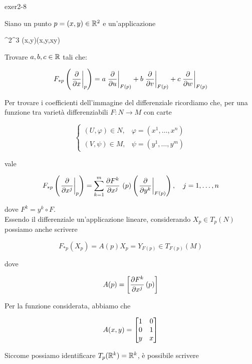 {exer2-8}
{
Siano un punto $ p = (x,y) \in \mathbb{R}^{2} $ e un'applicazione

	{\R^{2}}{\R^{3}}
	{(x,y)}{(x,y,xy)}

Trovare $ a,b,c \in \mathbb{R} $ tali che:

\begin{equation}
	F_{*p} \left( \eval{ \pdv{x} }_{p} \right) = a \eval{ \pdv{u} }_{F(p)} + b \eval{ \pdv{v} }_{F(p)} + c \eval{ \pdv{w} }_{F(p)}
\end{equation}
}
{
Per trovare i coefficienti dell'immagine del differenziale ricordiamo che, per una funzione tra varietà differenziabili $ F : N \to M $ con carte

\begin{equation}
	\begin{cases}
		(U,\varphi) \in N, & \varphi = (x^{1},\dots,x^{n}) \\
		(V,\psi) \in M, & \psi = (y^{1},\dots,y^{m})
	\end{cases}
\end{equation}

vale

\begin{equation}
	F_{*p} \left( \eval{\pdv{x^{j}}}_{p} \right) = \sum_{k=1}^{m} \pdv{F^{k}}{x^{j}}\ (p) \left( \eval{\pdv{y^{k}}}_{F(p)} \right) \qcomma j = 1,\dots,n
\end{equation}

dove $ F^{k} = y^{k} \circ F $. \\
Essendo il differenziale un'applicazione lineare, considerando $ X_{p} \in T_{p}(N) $ possiamo anche scrivere

\begin{equation}
	F_{*p} (X_{p}) = A(p) X_{p} = Y_{F(p)} \in T_{F(p)}(M)
\end{equation}

dove

\begin{equation}
	A(p) = \left[ \pdv{F^{k}}{x^{j}} \, (p) \right]
\end{equation}

Per la funzione considerata, abbiamo che

\begin{equation}
	A(x,y) = \bmqty{ 1 & 0 \\ 0 & 1 \\ y & x }
\end{equation}

Siccome possiamo identificare $ T_{p}(\mathbb{R}^{k}) = \mathbb{R}^{k} $, è possibile scrivere

}

